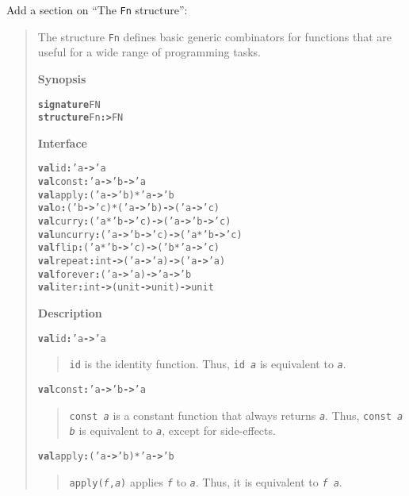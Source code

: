 \documentclass[twoside,titlepage]{article}
\begin{document}
\begin{appendix}
{Add a section on ``The {\tt Fn} structure'':
\begin{quote}
The structure {\tt Fn} defines basic generic combinators for functions that are useful for a wide range of programming tasks.

{\bf Synopsis}
\begin{alltt}
\textbf{signature} FN
\textbf{structure} Fn \textbf{:>} FN
\end{alltt}

{\bf Interface}
\begin{alltt}
\textbf{val} id \textbf{:} 'a \textbf{->} 'a
\textbf{val} const \textbf{:} 'a \textbf{->} 'b \textbf{->} 'a
\textbf{val} apply \textbf{:} ('a \textbf{->} 'b) * 'a \textbf{->} 'b
\textbf{val} o \textbf{:} ('b \textbf{->} 'c) * ('a \textbf{->} 'b) \textbf{->} ('a \textbf{->} 'c)
\textbf{val} curry \textbf{:} ('a * 'b \textbf{->} 'c) \textbf{->} ('a \textbf{->} 'b \textbf{->} 'c)
\textbf{val} uncurry \textbf{:} ('a \textbf{->} 'b \textbf{->} 'c) \textbf{->} ('a * 'b \textbf{->} 'c)
\textbf{val} flip \textbf{:} ('a * 'b \textbf{->} 'c) \textbf{->} ('b * 'a \textbf{->} 'c)
\textbf{val} repeat \textbf{:} int \textbf{->} ('a \textbf{->} 'a) \textbf{->} ('a \textbf{->} 'a)
\textbf{val} forever \textbf{:} ('a \textbf{->} 'a) \textbf{->} 'a \textbf{->} 'b
\textbf{val} iter \textbf{:} int \textbf{->} (unit \textbf{->} unit) \textbf{->} unit
\end{alltt}

{\bf Description}
\begin{alltt}
\textbf{val} id \textbf{:} 'a \textbf{->} 'a
\end{alltt}
  \begin{quote}
  {\tt id} is the identity function. Thus, {\tt id \textsl{a}} is equivalent to {\tt\textsl{a}}.
  \end{quote}

\begin{alltt}
\textbf{val} const \textbf{:} 'a \textbf{->} 'b \textbf{->} 'a
\end{alltt}
  \begin{quote}
  {\tt const \textsl{a}} is a constant function that always returns {\tt\textsl{a}}. Thus, {\tt const \textsl{a b}} is equivalent to {\tt\textsl{a}}, except for side-effects.
  \end{quote}

\begin{alltt}
\textbf{val} apply \textbf{:} ('a \textbf{->} 'b) * 'a \textbf{->} 'b
\end{alltt}
  \begin{quote}
  {\tt apply(\textsl{f},\textsl{a})} applies {\tt\textsl{f}} to {\tt\textsl{a}}. Thus, it is equivalent to {\tt\textsl{f a}}.
  \end{quote}


\end{quote}}
\end{appendix}
\end{document}

